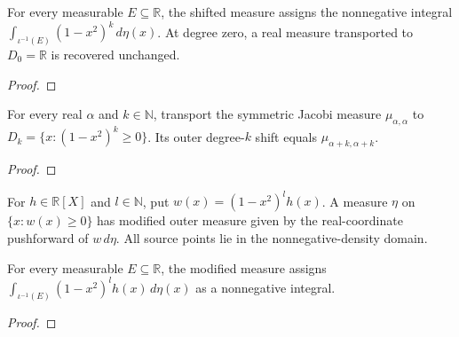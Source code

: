 \begin{supporting}
\begin{theorem}
\label{thm:disk-outer-measure}
\leanok
For every measurable $E\subseteq\mathbb R$, the shifted measure assigns the
nonnegative integral $\int_{\iota^{-1}(E)}(1-x^2)^k\,d\eta(x)$.
At degree zero, a real measure transported to $D_0=\mathbb R$ is recovered unchanged.
\end{theorem}
\begin{proof}
\leanok
\end{proof}

\begin{theorem}
\label{thm:jacobi-disk-outer-shift}
\leanok
For every real $\alpha$ and $k\in\mathbb N$, transport the symmetric Jacobi
measure $\mu_{\alpha,\alpha}$ to $D_k=\{x:(1-x^2)^k\ge0\}$.
Its outer degree-$k$ shift equals $\mu_{\alpha+k,\alpha+k}$.
\end{theorem}
\begin{proof}
\leanok
\end{proof}

\begin{definition}
\label{def:disk-outer-modification}
\leanok
For $h\in\mathbb R[X]$ and $l\in\mathbb N$, put $w(x)=(1-x^2)^l h(x)$.
A measure $\eta$ on $\{x:w(x)\ge0\}$ has modified outer measure given by the
real-coordinate pushforward of $w\,d\eta$. All source points lie in the
nonnegative-density domain.
\end{definition}

\begin{theorem}
\label{thm:disk-outer-modification}
\leanok
For every measurable $E\subseteq\mathbb R$, the modified measure assigns
$\int_{\iota^{-1}(E)}(1-x^2)^l h(x)\,d\eta(x)$ as a nonnegative integral.
\end{theorem}
\begin{proof}
\leanok
\end{proof}
\end{supporting}


